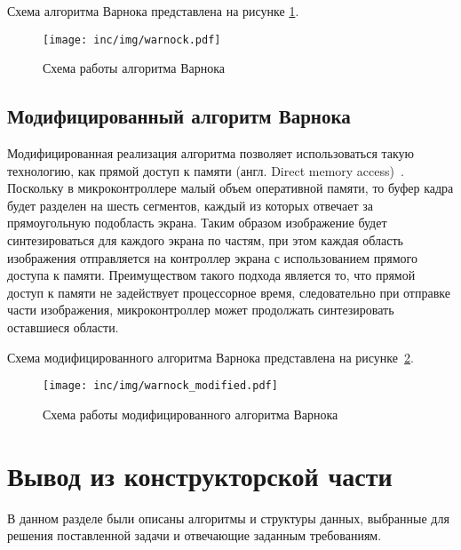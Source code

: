 Схема алгоритма Варнока представлена на рисунке \ref{fig:warnock}.

\begin{figure}[H]
	\centering
	\texttt{[image: inc/img/warnock.pdf]}
	\caption{Схема работы алгоритма Варнока}
	\label{fig:warnock}
\end{figure}

\subsection{Модифицированный алгоритм Варнока}
Модифицированная реализация алгоритма позволяет использоваться такую технологию, как прямой доступ к памяти (англ. Direct memory access)~\cite{dma}. Поскольку в микроконтроллере малый объем оперативной памяти, то буфер кадра будет разделен на шесть сегментов, каждый из которых отвечает за прямоугольную подобласть экрана. Таким образом изображение будет синтезироваться для каждого экрана по частям, при этом каждая область изображения отправляется на контроллер экрана с использованием прямого доступа к памяти. Преимуществом такого подхода является то, что прямой доступ к памяти не задействует процессорное время, следовательно при отправке части изображения, микроконтроллер может продолжать синтезировать оставшиеся области. 

Схема модифицированного алгоритма Варнока представлена на рисунке~\ref{fig:warnock_modified}.
\begin{figure}[H]
	\centering
	\texttt{[image: inc/img/warnock\_modified.pdf]}
	\caption{Схема работы модифицированного алгоритма Варнока}
	\label{fig:warnock_modified}
\end{figure}

\section{Вывод из конструкторской части}
В данном разделе были описаны алгоритмы и структуры данных, выбранные для решения поставленной задачи и отвечающие заданным требованиям. 
